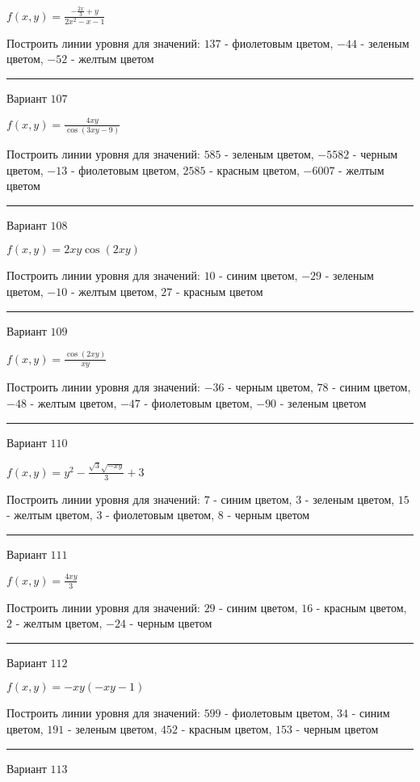 \documentclass[11pt]{report}
\begin{document}
$f(x, y) = \frac{- \frac{2 x}{3} + y}{2 x^{2} - x - 1}$

Построить линии уровня для значений: $137$ - фиолетовым цветом, $-44$ - зеленым цветом, $-52$ - желтым цветом
\begin{center}
\noindent\rule{8cm}{0.4pt}
\end{center}
Вариант $107$


$f(x, y) = \frac{4 x y}{\cos{\left(3 x y - 9 \right)}}$

Построить линии уровня для значений: $585$ - зеленым цветом, $-5582$ - черным цветом, $-13$ - фиолетовым цветом, $2585$ - красным цветом, $-6007$ - желтым цветом
\begin{center}
\noindent\rule{8cm}{0.4pt}
\end{center}
Вариант $108$


$f(x, y) = 2 x y \cos{\left(2 x y \right)}$

Построить линии уровня для значений: $10$ - синим цветом, $-29$ - зеленым цветом, $-10$ - желтым цветом, $27$ - красным цветом
\begin{center}
\noindent\rule{8cm}{0.4pt}
\end{center}
Вариант $109$


$f(x, y) = \frac{\cos{\left(2 x y \right)}}{x y}$

Построить линии уровня для значений: $-36$ - черным цветом, $78$ - синим цветом, $-48$ - желтым цветом, $-47$ - фиолетовым цветом, $-90$ - зеленым цветом
\begin{center}
\noindent\rule{8cm}{0.4pt}
\end{center}
Вариант $110$


$f(x, y) = y^{2} - \frac{\sqrt{3} \sqrt{- x y}}{3} + 3$

Построить линии уровня для значений: $7$ - синим цветом, $3$ - зеленым цветом, $15$ - желтым цветом, $3$ - фиолетовым цветом, $8$ - черным цветом
\begin{center}
\noindent\rule{8cm}{0.4pt}
\end{center}
Вариант $111$


$f(x, y) = \frac{4 x y}{3}$

Построить линии уровня для значений: $29$ - синим цветом, $16$ - красным цветом, $2$ - желтым цветом, $-24$ - черным цветом
\begin{center}
\noindent\rule{8cm}{0.4pt}
\end{center}
Вариант $112$


$f(x, y) = - x y \left(- x y - 1\right)$

Построить линии уровня для значений: $599$ - фиолетовым цветом, $34$ - синим цветом, $191$ - зеленым цветом, $452$ - красным цветом, $153$ - черным цветом
\begin{center}
\noindent\rule{8cm}{0.4pt}
\end{center}
Вариант $113$
\end{document}
